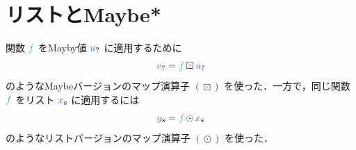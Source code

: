 \documentclass[a5paper,twoside,fleqn,draft]{jsbook}
\def\varColor{NavyBlue}
\def\funcColor{BlueGreen}
\newcommand{\programminglanguage}[1]{\textsf{#1}}
\newcommand{\cxx}{\programminglanguage{C}\texttt{++}}
\newcommand{\code}[1]{\texttt{#1}}
\newcommand{\mVar}[1]{\textcolor{\varColor}{#1}}
\newcommand{\mFunc}[1]{\textcolor{\funcColor}{#1}}
\newcommand{\mFFunc}{{\mFunc{f}}}
\DeclareMathOperator{\mMapList}{\odot}
\DeclareMathOperator{\mMapMaybe}{\boxdot}
\newcommand{\mList}[1]{\mVar{#1}_\mathrm{s}}
\newcommand{\mMaybe}[1]{\mVar{#1}_?}
\begin{document}

\section{リストとMaybe*}

関数 $\mFFunc$ をMayby値 $\mMaybe{u}$ に適用するために
\begin{equation}
  \mMaybe{v}
  =\mFFunc\mMapMaybe\mMaybe{u}
\end{equation}
のようなMaybeバージョンのマップ演算子 $(\mMapMaybe)$ を使った．一方で，同じ関数 $\mFFunc$ をリスト $\mList{x}$ に適用するには
\begin{equation}
  \mList{y}
  =\mFFunc\mMapList\mList{x}
\end{equation}
のようなリストバージョンのマップ演算子 $(\mMapList)$ を使った．
\end{document}
